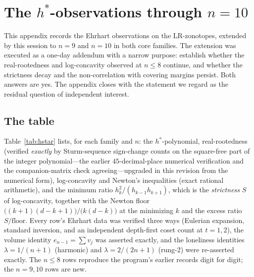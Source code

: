 
\appendix
\section{The \boldmath$h^*$-observations through \boldmath$n=10$}
\label{sec:hstar}

This appendix records the Ehrhart observations on the LR-zonotopes,
extended by this session to $n=9$ and $n=10$ in both core families. The
extension was executed as a one-day addendum with a narrow purpose:
establish whether the real-rootedness and log-concavity observed at
$n\le8$ continue, and whether the strictness decay and the
non-correlation with covering margins persist. Both answers are yes. The
appendix closes with the statement we regard as the residual question of
independent interest.

\subsection{The table}

Table~\ref{tab:hstar} lists, for each family and $n$: the
$h^*$-polynomial, real-rootedness (verified \emph{exactly} by
Sturm-sequence sign-change counts on the square-free part of the integer
polynomial---the earlier $45$-decimal-place numerical verification and
the companion-matrix check agreeing---upgraded in this revision from the
numerical form), log-concavity and Newton's inequalities (exact rational
arithmetic), and the minimum ratio $h_k^2/(h_{k-1}h_{k+1})$, which is
the \emph{strictness} $S$ of log-concavity, together with the Newton
floor $\bigl((k{+}1)(d{-}k{+}1)\bigr)/\bigl(k(d{-}k)\bigr)$ at the
minimizing $k$ and the excess ratio $S/\text{floor}$. Every row's Ehrhart data was
verified three ways (Eulerian expansion, standard inversion, and an
independent depth-first coset count at $t=1,2$), the volume identity
$e_{n-1}=\sum v_j$ was asserted exactly, and the loneliness identities
$\lambda=1/(n{+}1)$ (harmonic) and $\lambda=2/(2n{+}1)$ (rung-2) were
re-asserted exactly. The $n\le8$ rows reproduce the program's earlier
records digit for digit; the $n=9,10$ rows are new.

